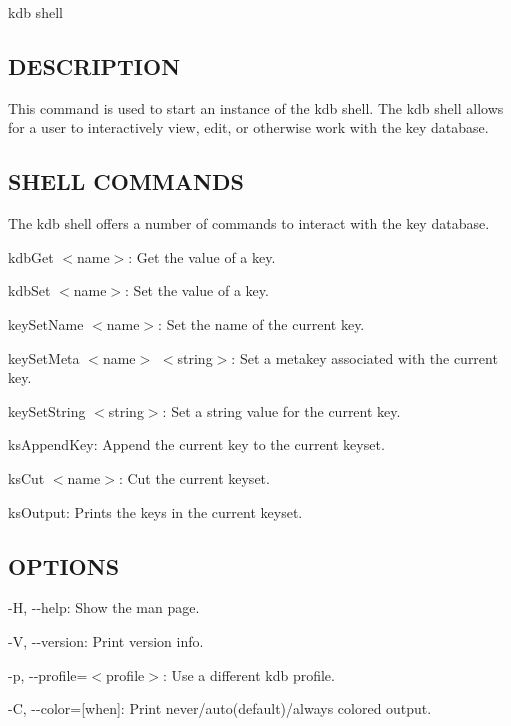 {\ttfamily kdb shell}

\subsection*{D\+E\+S\+C\+R\+I\+P\+T\+I\+O\+N}

This command is used to start an instance of the kdb shell. The kdb shell allows for a user to interactively view, edit, or otherwise work with the key database.

\subsection*{S\+H\+E\+L\+L C\+O\+M\+M\+A\+N\+D\+S}

The kdb shell offers a number of commands to interact with the key database.


\begin{DoxyItemize}
\item {\ttfamily kdb\+Get $<$name$>$}\+: Get the value of a key.
\item {\ttfamily kdb\+Set $<$name$>$}\+: Set the value of a key.
\item {\ttfamily key\+Set\+Name $<$name$>$}\+: Set the name of the current key.
\item {\ttfamily key\+Set\+Meta $<$name$>$ $<$string$>$}\+: Set a metakey associated with the current key.
\item {\ttfamily key\+Set\+String $<$string$>$}\+: Set a string value for the current key.
\item {\ttfamily ks\+Append\+Key}\+: Append the current key to the current keyset.
\item {\ttfamily ks\+Cut $<$name$>$}\+: Cut the current keyset.
\item {\ttfamily ks\+Output}\+: Prints the keys in the current keyset.
\end{DoxyItemize}

\subsection*{O\+P\+T\+I\+O\+N\+S}


\begin{DoxyItemize}
\item {\ttfamily -\/\+H}, {\ttfamily -\/-\/help}\+: Show the man page.
\item {\ttfamily -\/\+V}, {\ttfamily -\/-\/version}\+: Print version info.
\item {\ttfamily -\/p}, {\ttfamily -\/-\/profile}=$<$profile$>$\+: Use a different kdb profile.
\item {\ttfamily -\/\+C}, {\ttfamily -\/-\/color}=\mbox{[}when\mbox{]}\+: Print never/auto(default)/always colored output.
\end{DoxyItemize}

